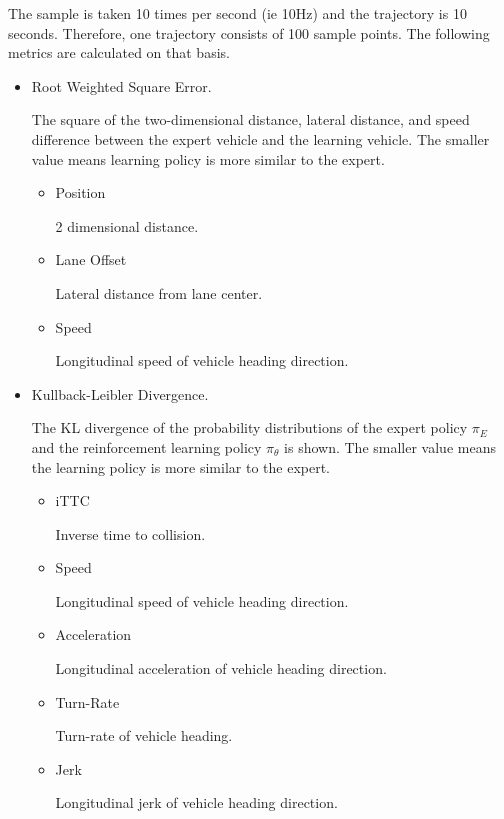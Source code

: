 The sample is taken 10 times per second (ie 10Hz) and the trajectory is 10 seconds. Therefore, one trajectory consists of 100 sample points.
The following metrics are calculated on that basis.

\begin{itemize}
\item Root Weighted Square Error.

The square of the two-dimensional distance, lateral distance, and speed difference between the expert vehicle and the learning vehicle. The smaller value means learning policy is more similar to the expert.

\begin{itemize}
\item Position

2 dimensional distance. 
 
\item Lane Offset

Lateral distance from lane center.

\item Speed

Longitudinal speed of vehicle heading direction.

\end{itemize}
\item Kullback-Leibler Divergence.

The KL divergence of the probability distributions of the expert policy $\pi_E$ and the reinforcement learning policy $\pi_\theta$ is shown. The smaller  value means the learning policy is more similar to the expert.

\begin{itemize}
\item iTTC

Inverse time to collision.

\item Speed

Longitudinal speed of vehicle heading direction.

\item Acceleration

Longitudinal acceleration of vehicle heading direction.

\item Turn-Rate

Turn-rate of vehicle heading.

\item Jerk

Longitudinal jerk of vehicle heading direction.


\end{itemize}
\end{itemize}
